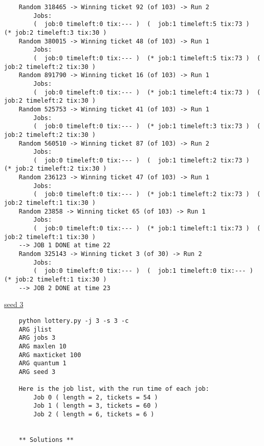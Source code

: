 \documentclass{article}
\begin{document}
\begin{enumerate}
\begin{verbatim}
    Random 318465 -> Winning ticket 92 (of 103) -> Run 2
        Jobs:
        (  job:0 timeleft:0 tix:--- )  (  job:1 timeleft:5 tix:73 )  (* job:2 timeleft:3 tix:30 ) 
    Random 380015 -> Winning ticket 48 (of 103) -> Run 1
        Jobs:
        (  job:0 timeleft:0 tix:--- )  (* job:1 timeleft:5 tix:73 )  (  job:2 timeleft:2 tix:30 ) 
    Random 891790 -> Winning ticket 16 (of 103) -> Run 1
        Jobs:
        (  job:0 timeleft:0 tix:--- )  (* job:1 timeleft:4 tix:73 )  (  job:2 timeleft:2 tix:30 ) 
    Random 525753 -> Winning ticket 41 (of 103) -> Run 1
        Jobs:
        (  job:0 timeleft:0 tix:--- )  (* job:1 timeleft:3 tix:73 )  (  job:2 timeleft:2 tix:30 ) 
    Random 560510 -> Winning ticket 87 (of 103) -> Run 2
        Jobs:
        (  job:0 timeleft:0 tix:--- )  (  job:1 timeleft:2 tix:73 )  (* job:2 timeleft:2 tix:30 ) 
    Random 236123 -> Winning ticket 47 (of 103) -> Run 1
        Jobs:
        (  job:0 timeleft:0 tix:--- )  (* job:1 timeleft:2 tix:73 )  (  job:2 timeleft:1 tix:30 ) 
    Random 23858 -> Winning ticket 65 (of 103) -> Run 1
        Jobs:
        (  job:0 timeleft:0 tix:--- )  (* job:1 timeleft:1 tix:73 )  (  job:2 timeleft:1 tix:30 ) 
    --> JOB 1 DONE at time 22
    Random 325143 -> Winning ticket 3 (of 30) -> Run 2
        Jobs:
        (  job:0 timeleft:0 tix:--- )  (  job:1 timeleft:0 tix:--- )  (* job:2 timeleft:1 tix:30 ) 
    --> JOB 2 DONE at time 23
    \end{verbatim}
    \underline{seed 3}
    \begin{verbatim}
    python lottery.py -j 3 -s 3 -c
    ARG jlist 
    ARG jobs 3
    ARG maxlen 10
    ARG maxticket 100
    ARG quantum 1
    ARG seed 3
    
    Here is the job list, with the run time of each job: 
        Job 0 ( length = 2, tickets = 54 )
        Job 1 ( length = 3, tickets = 60 )
        Job 2 ( length = 6, tickets = 6 )
    
    
    ** Solutions **
    

\end{verbatim}
\end{enumerate}
\end{document}
